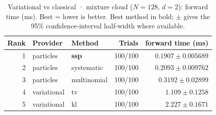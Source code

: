 \begin{table}[!htbp]
\centering
\small
\caption{Variational vs classical · mixture cloud ($N=128$, $d=2$): forward time (ms). Best = lower is better. Best method in bold; $\pm$ gives the 95\% confidence-interval half-width where available.}
\label{tab:variational-vs-classical-mixture-cloud-forward-ms}
\begin{tabular}{rllrr}
\toprule
Rank & Provider & Method & Trials & forward time (ms) \\
\midrule
1 & particles & \textbf{ssp} & 100/100 & $\mathbf{0.1907 \pm 0.005689}$ \\
2 & particles & systematic & 100/100 & $0.2093 \pm 0.009762$ \\
3 & particles & multinomial & 100/100 & $0.3192 \pm 0.02899$ \\
4 & variational & tv & 100/100 & $1.109 \pm 0.1258$ \\
5 & variational & kl & 100/100 & $2.227 \pm 0.1671$ \\
\bottomrule
\end{tabular}
\end{table}
